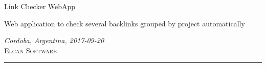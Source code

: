 \documentclass[a4paper]{article}
\author{%
	Mario O. Villarroel \\
	Customer Care/System Design\\
	\texttt{movilla@elcansoftware.com}\vspace{20pt} \\
	Juan P. Aguilar\\
	System Development \\
	\texttt{aguilarjpb@elcansoftware.com}
}
\def\documentdate{Cordoba, Argentina, 2017-09-20}
\begin{document}
	\begin{titlepage}
		\noindent
		\titlefont Link Checker WebApp \par
		\epigraph{Web application to check several backlinks grouped by project automatically}%
		{\textit{\documentdate}\\ \textsc{Elcan Software}}
		\null\vfill
		\vspace*{1cm}
		\noindent
		\hfill
		\begin{minipage}{0.50\linewidth}
		    \begin{flushright}
		        \printauthor
		    \end{flushright}
		\end{minipage}
		\begin{minipage}{0.02\linewidth}
		    \rule{1pt}{125pt}
		\end{minipage}
		\titlepagedecoration
	\end{titlepage}
	
	
\end{document}
